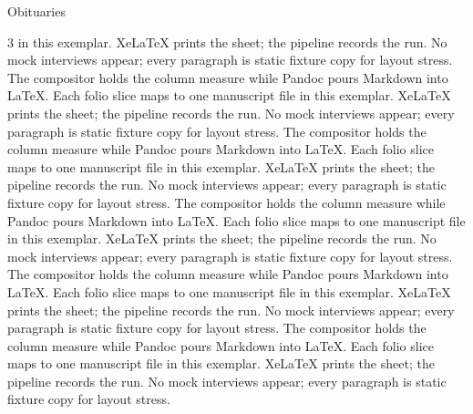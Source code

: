 \documentclass[
  ignorenonframetext,
]{beamer}
\begin{document}
\begin{frame}{Obituaries}
\begin{multicols}{3}
in this exemplar. XeLaTeX prints the sheet; the pipeline records the
run. No mock interviews appear; every paragraph is static fixture copy
for layout stress. The compositor holds the column measure while Pandoc
pours Markdown into LaTeX. Each folio slice maps to one manuscript file
in this exemplar. XeLaTeX prints the sheet; the pipeline records the
run. No mock interviews appear; every paragraph is static fixture copy
for layout stress. The compositor holds the column measure while Pandoc
pours Markdown into LaTeX. Each folio slice maps to one manuscript file
in this exemplar. XeLaTeX prints the sheet; the pipeline records the
run. No mock interviews appear; every paragraph is static fixture copy
for layout stress. The compositor holds the column measure while Pandoc
pours Markdown into LaTeX. Each folio slice maps to one manuscript file
in this exemplar. XeLaTeX prints the sheet; the pipeline records the
run. No mock interviews appear; every paragraph is static fixture copy
for layout stress. The compositor holds the column measure while Pandoc
pours Markdown into LaTeX. Each folio slice maps to one manuscript file
in this exemplar. XeLaTeX prints the sheet; the pipeline records the
run. No mock interviews appear; every paragraph is static fixture copy
for layout stress. The compositor holds the column measure while Pandoc
pours Markdown into LaTeX. Each folio slice maps to one manuscript file
in this exemplar. XeLaTeX prints the sheet; the pipeline records the
run. No mock interviews appear; every paragraph is static fixture copy
for layout stress.

\end{multicols}
\end{frame}
\end{document}
